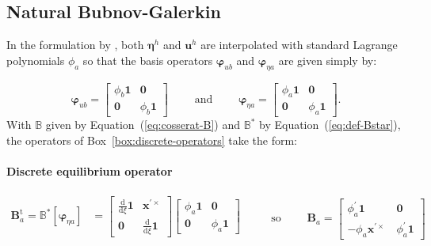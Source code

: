 \hypertarget{sec:element-svq}{%
\subsection{Natural Bubnov-Galerkin}\label{sec:element-svq}}

In the formulation by \cite{simo1986threedimensional}, both
\(\bm{\eta}^h\) and \(\bm{u}^h\) are interpolated with standard
Lagrange polynomials \(\phi_a\) so that the basis operators
\(\bm{\varphi}^{}_{u b}\) and \(\bm{\varphi}^{}_{\eta a}\) are given
simply by:

%
\begin{equation*} 
\bm{\varphi}^{}_{u b} = \begin{bmatrix}
    \phi_b \mathbf{1} & \mathbf{0} \\
    \mathbf{0} & \phi_b \mathbf{1}
\end{bmatrix}
\qquad\text{ and }\qquad
\bm{\varphi}^{}_{\eta a} = 
    \begin{bmatrix}
    \phi_a \mathbf{1} & \mathbf{0} \\
    \mathbf{0} & \phi_a \mathbf{1}
\end{bmatrix}.
\end{equation*}
With \(\mathbb{B}\) given by Equation~(\ref{eq:cosserat-B}) and \(\mathbb{B}^*\)
by Equation~(\ref{eq:def-Bstar}), the operators of Box~\ref{box:discrete-operators} take the form:

\paragraph{Discrete equilibrium operator}
\begin{equation}
   \begin{aligned}
   \bm{B}_a^{\mathrm{t}} = \mathbb{B}^*[\bm{\varphi}^{}_{\eta a}] &=\begin{bmatrix}
   \frac{\mathrm{d}}{\mathrm{d} \xi}\mathbf{1} & \bm{x}^{\prime \times}  \\
   \mathbf{0} & \frac{\mathrm{d}}{\mathrm{d} \xi} \mathbf{1}
   \end{bmatrix}
   \begin{bmatrix}
   \phi_a \mathbf{1} & \mathbf{0} \\
   \mathbf{0} & \phi_a \mathbf{1}
   \end{bmatrix} \\ 
   \end{aligned}
   \qquad\text{ so }\qquad
   \bm{B}_a = \begin{bmatrix}
       \phi_a^\prime\mathbf{1} & \mathbf{0} \\
       -\phi_a \bm{x}^{\prime\times} \, & \phi_a^{\prime} \mathbf{1}
   \end{bmatrix} 
   \label{eq:Ba-svq}
\end{equation}


